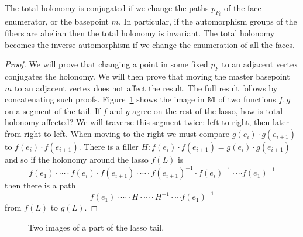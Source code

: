 \begin{myprop}
The total holonomy is conjugated if we change the paths \( p_{F_i} \) of the face enumerator, or the basepoint \( m \). In particular, if the automorphism groups of the fibers are abelian then the total holonomy is invariant. The total holonomy becomes the inverse automorphism if we change the enumeration of all the faces.
\end{myprop}
\begin{proof}
We will prove that changing a point in some fixed \( p_F \) to an adjacent vertex conjugates the holonomy. We will then prove that moving the master basepoint \( m \) to an adjacent vertex does not affect the result. The full result follows by concatenating such proofs. Figure~\ref{fig:tail_move} shows the image in \( \mathbb{M} \) of two functions \( f, g \) on a segment of the tail. If \( f \) and \( g \) agree on the rest of the lasso, how is total holonomy affected? We will traverse this segment twice: left to right, then later from right to left. When moving to the right we must compare \( g(e_i)\cdot g(e_{i+1}) \) to \( f(e_i)\cdot f(e_{i+1}) \). There is a filler \( H:f(e_i)\cdot f(e_{i+1})=g(e_i)\cdot g(e_{i+1}) \) and so if the holonomy around the lasso \( f(L) \) is \[ f(e_1)\cdot\cdots\cdot f(e_i)\cdot f(e_{i+1})\cdot\cdots\cdot f(e_{i+1})^{-1}\cdot f(e_i)^{-1}\cdot\cdots f(e_1)^{-1} \] then there is a path \[ f(e_1)\cdot\cdots\cdot H\cdot\cdots\cdot H^{-1}\cdot\cdots f(e_1)^{-1} \] from \( f(L) \) to \( g(L) \).
\end{proof}

\begin{figure}[h]
\centering
{}
\caption{Two images of a part of the lasso tail.}
\label{fig:tail_move}
\end{figure}

